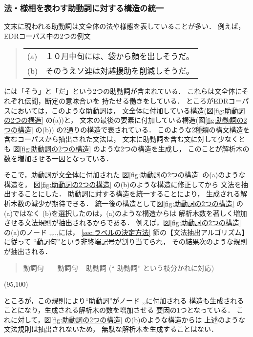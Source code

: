 \subsubsection{法・様相を表わす助動詞に対する構造の統一}
\label{sec:助動詞に関する修正}

文末に現われる助動詞は文全体の法や様態を表していることが多い．
例えば，EDRコーパス中の2つの例文
\begin{quote}
  \smallskip
  \begin{tabular}{ll}
    (a) & １０月中旬には、袋から顔を出しそうだ。 \\
    (b) & そのうえソ連は対越援助を削減しそうだ。 \\
  \end{tabular}
  \smallskip
\end{quote}
には「そう」と「だ」という2つの助動詞が含まれている．
これらは文全体にそれぞれ伝聞，断定の意味合いを
持たせる働きをしている．
ところがEDRコーパスにおいては，このような助動詞は，
文全体に付加している構造(図\ref{fig:助動詞の2つの構造} の(a))と，
文末の最後の要素に付加している構造(図\ref{fig:助動詞の2つの構造} の(b))
の2通りの構造で表されている．
このような2種類の構文構造を含むコーパスから抽出された文法は，
文末に助動詞を含む文に対して少なくとも
図\ref{fig:助動詞の2つの構造} のような2つの構造を生成し，
このことが解析木の数を増加させる一因となっている．


そこで，助動詞が文全体に付加された
図\ref{fig:助動詞の2つの構造} の(a)のような構造を，
図\ref{fig:助動詞の2つの構造} の(b)のような構造に修正してから
文法を抽出することにした．
助動詞に対する構造を統一することにより，
生成される解析木数の減少が期待できる．
統一後の構造として図\ref{fig:助動詞の2つの構造} の(a)ではなく
(b)を選択したのは，(a)のような構造からは
解析木数を著しく増加させる文法規則が抽出されるからである．
例えば，図\ref{fig:助動詞の2つの構造} の(a)のノード
,,,,,には，
\ref{sec:ラベルの決定方法} 節の【文法抽出アルゴリズム】に従って
``動詞句''という非終端記号が割り当てられ，
その結果次のような規則が抽出される．
\begin{quote}
  動詞句 ~  ~ 動詞句 ~ 助動詞  \qquad
  (``   助動詞'' という枝分かれに対応)
\end{quote}

\begin{center}
  \atari(95,100)
\end{center}

\noindent
ところが，この規則により``助動詞''がノード
,,に付加される
構造も生成されることになり，生成される解析木の数を増加させる
要因の1つとなっている．
これに対して，図\ref{fig:助動詞の2つの構造} の(b)のような構造からは
上述のような文法規則は抽出されないため，
無駄な解析木を生成することはない．
\vspace{-1mm}
